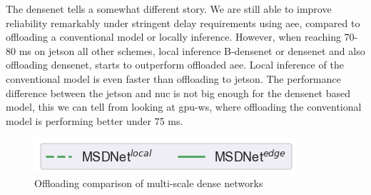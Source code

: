 The \gls{densenet} tells a somewhat different story. We are still able to improve reliability remarkably under stringent delay requirements using \gls{aee}, compared to offloading a conventional model or locally inference. However, when reaching 70-80 ms on \gls{jetson} all other schemes, local inference B-\gls{densenet} or \gls{densenet} and also offloading \gls{densenet}, starts to outperform offloaded \gls{aee}. Local inference of the conventional model is even faster than offloading to \gls{jetson}. The performance difference between the \gls{jetson} and \gls{nuc} is not big enough for the \gls{densenet} based model, this we can tell from looking at \gls{gpu-ws}, where offloading the conventional model is performing better under 75 ms. 

\begin{figure}
	\captionsetup[subfigure]{justification=centering, farskip=0pt,captionskip=0pt}
	\centering
	\includegraphics[width=.3\linewidth]{figures/edge/gpu_msdnet_offloading_vs_local_legend}
	\hfill
	\hfill
	\caption[Offloading comparison of multi-scale dense networks]{Offloading comparison of multi-scale dense networks}
	\label{fig:msdnet-offloading-vs-local}
\end{figure}

